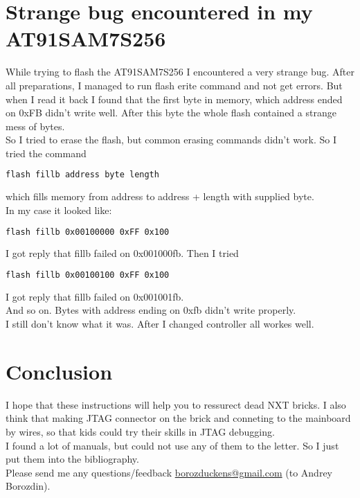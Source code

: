 \documentclass[11pt]{article}
\begin{document}
	\section{Strange bug encountered in my AT91SAM7S256}
		While trying to flash the AT91SAM7S256 I encountered a very strange bug. After all preparations, I managed to run flash erite command and not get errors. But when I read it back I found that the first byte in memory, which address ended on 0xFB didn't write well. After this byte the whole flash contained a strange mess of bytes.\\
		So I tried to erase the flash, but common erasing commands didn't work. So I tried the command
		\begin{lstlisting}[language=bash]
flash fillb address byte length
		\end{lstlisting}
		which fills memory from address to address + length with supplied byte.\\
		In my case it looked like:
		\begin{lstlisting}[language=bash]
flash fillb 0x00100000 0xFF 0x100
		\end{lstlisting}
		I got reply that fillb failed on 0x001000fb. Then I tried 
		\begin{lstlisting}[language=bash]
flash fillb 0x00100100 0xFF 0x100
		\end{lstlisting}
		I got reply that fillb failed on 0x001001fb.\\
		And so on. Bytes with address ending on 0xfb didn't write properly.\\
		I still don't know what it was. After I changed controller all workes well.
	\section{Conclusion}
		I hope that these instructions will help you to ressurect dead NXT bricks. I also think that making JTAG connector on the brick and conneting to the mainboard by wires, so that kids could try their skills in JTAG debugging.\\
		I found a lot of manuals, but could not use any of them to the letter. So I just put them into the bibliography.\\
		Please send me any questions/feedback \href{mailto:borozduckens@gmail.com}{borozduckens@gmail.com} (to Andrey Borozdin).
\end{document}
